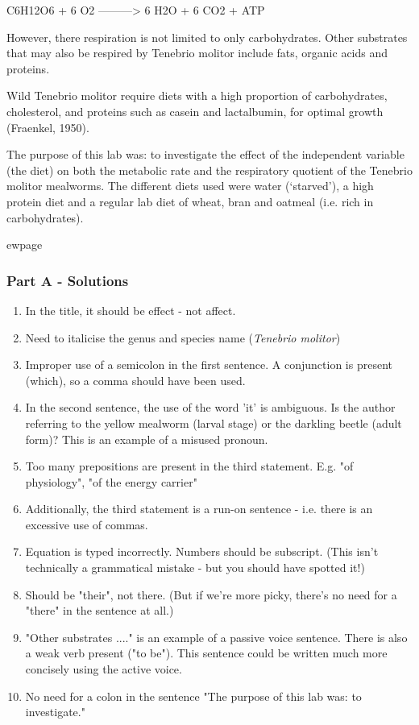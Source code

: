 \documentclass{article}
\begin{document}
C6H12O6 + 6 O2 ---------> 6 H2O + 6 CO2 + ATP 

However, there respiration is not limited to only carbohydrates. Other substrates that may also be respired by Tenebrio molitor include fats, organic acids and proteins. 

Wild Tenebrio molitor require diets with a high proportion of carbohydrates, cholesterol, and proteins such as casein and lactalbumin, for optimal growth (Fraenkel, 1950). 
 
The purpose of this lab was: to investigate the effect of the independent variable (the diet) on both the metabolic rate and the respiratory quotient of the Tenebrio molitor mealworms. The different diets used were water (‘starved’), a high protein diet and a regular lab diet of wheat, bran and oatmeal (i.e. rich in carbohydrates). 


ewpage
\subsubsection*{Part A - Solutions}

\begin{enumerate}
\item In the title, it should be effect - not affect.
\item Need to italicise the genus and species name (\textit{Tenebrio molitor})
\item Improper use of a semicolon in the first sentence. A conjunction is present (which), so a comma should have been used.
\item In the second sentence, the use of the word 'it' is ambiguous. Is the author referring to the yellow mealworm (larval stage) or the darkling beetle (adult form)? This is an example of a misused pronoun.
\item Too many prepositions are present in the third statement. E.g. "of physiology", "of the energy carrier"
\item Additionally, the third statement is a run-on sentence - i.e. there is an excessive use of commas.
\item Equation is typed incorrectly. Numbers should be subscript. (This isn't technically a grammatical mistake - but you should have spotted it!)
\item Should be "their", not there. (But if we're more picky, there's no need for a "there" in the sentence at all.)
\item "Other substrates ...." is an example of a passive voice sentence. There is also a weak verb present ("to be"). This sentence could be written much more concisely using the active voice.
\item No need for a colon in the sentence "The purpose of this lab was: to investigate."
\end{enumerate}
\end{document}
